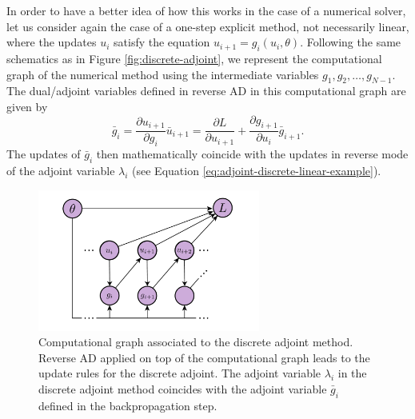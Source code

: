 In order to have a better idea of how this works in the case of a numerical solver, let us consider again the case of a one-step explicit method, not necessarily linear, where the updates $u_{i}$ satisfy the equation $u_{i+1} = g_{i}(u_{i}, \theta)$.
Following the same schematics as in Figure \ref{fig:discrete-adjoint}, we represent the computational graph of the numerical method using the intermediate variables $g_1, g_2, \ldots, g_{N-1}$.
The dual/adjoint variables defined in reverse AD in this computational graph are given by 
\begin{equation}
    \bar g_i
    = 
    \frac{\partial u_{i+1}}{\partial g_i} \bar u_{i+1}
    = 
    \frac{\partial L}{\partial u_{i+1}} 
    +
    \frac{\partial g_{i+1}}{\partial u_i} \bar g_{i+1}.
\end{equation}
The updates of $\bar g_i$ then mathematically coincide with the updates in reverse mode of the adjoint variable $\lambda_i$ (see Equation \eqref{eq:adjoint-discrete-linear-example}).

\begin{figure}[t]
    \centering
    \includegraphics[width=0.65\textwidth]{figures/AD-discrete-adjoint.pdf}
    \caption{Computational graph associated to the discrete adjoint method. Reverse AD applied on top of the computational graph leads to the update rules for the discrete adjoint. The adjoint variable $\lambda_i$ in the discrete adjoint method coincides with the adjoint variable $\bar g_i$ defined in the backpropagation step.}
    \label{fig:ad-vs-discrete-adjoint}
\end{figure}

